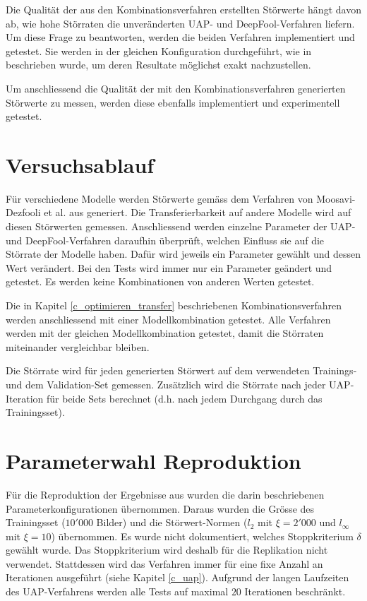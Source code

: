 \documentclass{FFHS_Thesis_Additions/ffhsthesis}
\begin{document}
Die Qualität der aus den Kombinationsverfahren erstellten Störwerte hängt davon ab, wie hohe Störraten die unveränderten UAP- und DeepFool-Verfahren liefern. Um diese Frage zu beantworten, werden die beiden Verfahren implementiert und getestet. Sie werden in der gleichen Konfiguration durchgeführt, wie in \cite{moosavi-dezfooli_universal_2017-1} beschrieben wurde, um deren Resultate möglichst exakt nachzustellen.

Um anschliessend die Qualität der mit den Kombinationsverfahren generierten Störwerte zu messen, werden diese ebenfalls implementiert und experimentell getestet. 

\section{Versuchsablauf}

Für verschiedene Modelle werden Störwerte gemäss dem Verfahren von Moosavi-Dezfooli et al. aus \cite{moosavi-dezfooli_universal_2017-1} generiert. 
Die Transferierbarkeit auf andere Modelle wird auf diesen Störwerten gemessen. 
Anschliessend werden einzelne Parameter der UAP- und DeepFool-Verfahren daraufhin überprüft, welchen Einfluss sie auf die Störrate der Modelle haben. Dafür wird jeweils ein Parameter gewählt und dessen Wert verändert. Bei den Tests wird immer nur ein Parameter geändert und getestet. Es werden keine Kombinationen von anderen Werten getestet.

Die in Kapitel \ref{c_optimieren_transfer} beschriebenen Kombinationsverfahren werden anschliessend mit einer Modellkombination getestet. Alle Verfahren werden mit der gleichen Modellkombination getestet, damit die Störraten miteinander vergleichbar bleiben.

Die Störrate wird für jeden generierten Störwert auf dem verwendeten Trainings- und dem Validation-Set gemessen. 
Zusätzlich wird die Störrate nach jeder UAP-Iteration für beide Sets berechnet (d.h. nach jedem Durchgang durch das Trainingsset).

\pagebreak

\section{Parameterwahl Reproduktion}
\label{c_parameterwahl}

Für die Reproduktion der Ergebnisse aus \cite{moosavi-dezfooli_universal_2017-1} wurden die darin beschriebenen Parameterkonfigurationen übernommen. 
Daraus wurden die Grösse des Trainingsset ($10'000$ Bilder) und die Störwert-Normen ($l_2$ mit $\xi=2'000$ und $l_\infty$ mit $\xi=10$) übernommen. 
Es wurde nicht dokumentiert, welches Stoppkriterium $\delta$ gewählt wurde. 
Das Stoppkriterium wird deshalb für die Replikation nicht verwendet. 
Stattdessen wird das Verfahren immer für eine fixe Anzahl an Iterationen ausgeführt (siehe Kapitel \ref{c_uap}). 
Aufgrund der langen Laufzeiten des UAP-Verfahrens werden alle Tests auf maximal $20$ Iterationen beschränkt.
\end{document}
